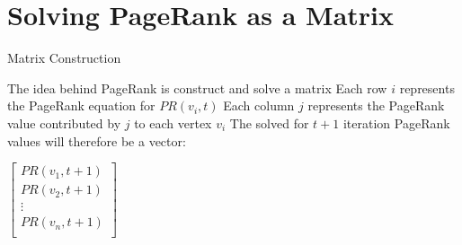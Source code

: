 \documentclass{beamer}
\begin{document}
\section{Solving PageRank as a Matrix}
\begin{frame}[t]{Matrix Construction}
\begin{outline}
    \1 The idea behind PageRank is construct and solve a matrix
    \1 Each row $i$ represents the PageRank equation for $PR(v_i, t)$ 
    \1 Each column $j$ represents the PageRank value contributed by $j$ to each vertex $v_i$
    \1 The solved for $t+1$ iteration PageRank values will therefore be a vector:
    \begin{center}
        \begin{math}
            \begin{bmatrix}
                PR(v_1, t+1)\\
                PR(v_2, t+1)\\
                \vdots\\
                PR(v_n, t+1)\\
            \end{bmatrix}
        \end{math}
    \end{center}
\end{outline}
\end{frame}
\end{document}
